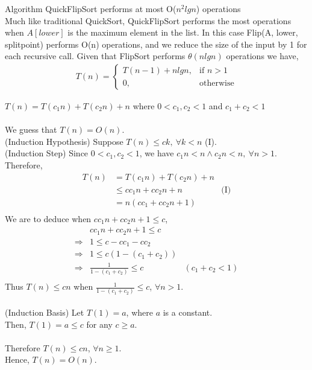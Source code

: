 \documentclass[12pt]{article}
\newenvironment{lemma}[2][Lemma]{\begin{trivlist}
\item[\hskip \labelsep {\bfseries #1}\hskip \labelsep {\bfseries #2.}]}{\end{trivlist}}
\newenvironment{question}[2][Question]{\begin{trivlist}
\item[\hskip \labelsep {\bfseries #1}\hskip \labelsep {\bfseries #2.}]}{\end{trivlist}}
\begin{document}
\begin{question}{1 (b)}
  \begin{lemma}{1.6} Algorithm QuickFlipSort performs at most O($n^{2}lgn$) operations \\

    Much like traditional QuickSort, QuickFlipSort performs the most operations when
    $A[lower]$ is the maximum element in the list.  In this case Flip(A, lower, splitpoint)
    performs O(n) operations, and we reduce the size of the input by 1 for each
    recursive call.  Given that FlipSort performs $\theta(nlgn)$ operations we have,
    \begin{align*}
      T(n) = \begin{cases}
        T(n -1) + nlgn, & \text{if } n > 1 \\
        0, & \text{otherwise}
        \end{cases}
    \end{align*}
  \end{lemma}
\end{question}

\begin{question}{2} $T(n) = T(c_{1}n) + T(c_{2}n) + n$ where $ 0 < c_{1}, c_{2} < 1$ and $c_{1} + c_{2} < 1$
  \leavevmode \\ \\
  We guess that $T(n) = O(n)$. \\
  (Induction Hypothesis) Suppose $T(n) \leq ck,\ \forall k < n$ (I). \\
  (Induction Step) Since $0 < c_{1}, c_{2} < 1$, we have $c_{1}n < n \land c_{2}n < n,\ \forall n > 1$.
  Therefore,
  \begin{align*}
    T(n) & = T(c_{1}n) + T(c_{2}n) + n & \\
         & \leq cc_{1}n + cc_{2}n + n & \text{(I)} \\
         & = n(cc_{1} + cc_{2}n + 1) & \\
  \end{align*}
  We are to deduce when $cc_{1}n + cc_{2}n + 1 \leq c$,
  \begin{align*}
    & cc_{1} n + cc_{2}n + 1 \leq c & \\
    \Rightarrow & 1 \leq c - cc_{1} - cc_{2} &\\
    \Rightarrow & 1 \leq c(1 - (c_{1} + c_{2})) &\\
    \Rightarrow & \frac{1}{1 - (c_{1} + c_{2})} \leq c & (c_{1} + c_{2} < 1)\\
  \end{align*}
  Thus $T(n) \leq cn$ when $\frac{1}{1 - (c_{1} + c_{2})} \leq c$, $\forall n > 1$. \\ \\
  (Induction Basis) Let $T(1) = a$, where $a$ is a constant.\\
  Then, $T(1) = a \leq c$ for any $c \geq a$. \\ \\
  Therefore $T(n) \leq cn$, $\forall n \geq 1$.\\
  Hence, $T(n) = O(n)$.
\end{question}
\end{document}
